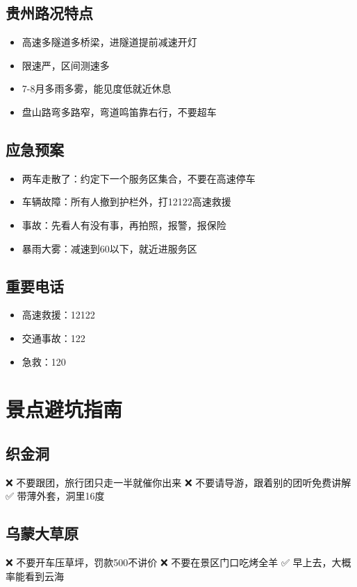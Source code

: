 \documentclass[12pt,a4paper,UTF8]{ctexart}
\begin{document}
\subsection{贵州路况特点}
\begin{itemize}
\item 高速多隧道多桥梁，进隧道提前减速开灯
\item 限速严，区间测速多
\item 7-8月多雨多雾，能见度低就近休息
\item 盘山路弯多路窄，弯道鸣笛靠右行，不要超车
\end{itemize}

\subsection{应急预案}
\begin{itemize}
\item 两车走散了：约定下一个服务区集合，不要在高速停车
\item 车辆故障：所有人撤到护栏外，打12122高速救援
\item 事故：先看人有没有事，再拍照，报警，报保险
\item 暴雨大雾：减速到60以下，就近进服务区
\end{itemize}

\subsection{重要电话}
\begin{itemize}
\item 高速救援：12122
\item 交通事故：122
\item 急救：120
\end{itemize}

\newpage

\section{景点避坑指南}

\subsection{织金洞}
❌ 不要跟团，旅行团只走一半就催你出来
❌ 不要请导游，跟着别的团听免费讲解
✅ 带薄外套，洞里16度

\subsection{乌蒙大草原}
❌ 不要开车压草坪，罚款500不讲价
❌ 不要在景区门口吃烤全羊
✅ 早上去，大概率能看到云海
\end{document}
